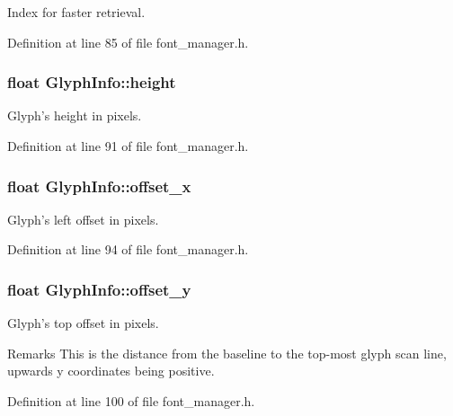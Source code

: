 Index for faster retrieval. 



Definition at line 85 of file font\+\_\+manager.\+h.

\hypertarget{struct_glyph_info_a573a4ed41d755a152d2949d02a22449c}{
\subsubsection[{height}]{\setlength{\rightskip}{0pt plus 5cm}float Glyph\+Info\+::height}}\label{struct_glyph_info_a573a4ed41d755a152d2949d02a22449c}


Glyph's height in pixels. 



Definition at line 91 of file font\+\_\+manager.\+h.

\hypertarget{struct_glyph_info_af7c352469c5fa93aad86a5681fd21561}{
\subsubsection[{offset\+\_\+x}]{\setlength{\rightskip}{0pt plus 5cm}float Glyph\+Info\+::offset\+\_\+x}}\label{struct_glyph_info_af7c352469c5fa93aad86a5681fd21561}


Glyph's left offset in pixels. 



Definition at line 94 of file font\+\_\+manager.\+h.

\hypertarget{struct_glyph_info_a0a4e24fed8ccb6af8efd08ee8b58d465}{
\subsubsection[{offset\+\_\+y}]{\setlength{\rightskip}{0pt plus 5cm}float Glyph\+Info\+::offset\+\_\+y}}\label{struct_glyph_info_a0a4e24fed8ccb6af8efd08ee8b58d465}
Glyph's top offset in pixels.

\begin{DoxyRemark}{Remarks}
This is the distance from the baseline to the top-\/most glyph scan line, upwards y coordinates being positive. 
\end{DoxyRemark}


Definition at line 100 of file font\+\_\+manager.\+h.

